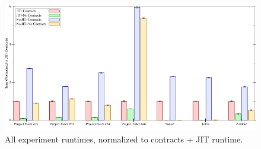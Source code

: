 \begin{figure}[t]
  \begin{center}
  \hspace*{-1.5cm}\includegraphics[width=15cm]{data/normalized-runtimes.png}
  \caption{All experiment runtimes, normalized to contracts + JIT runtime.}
  \label{runtimes}
  \end{center}
\end{figure}